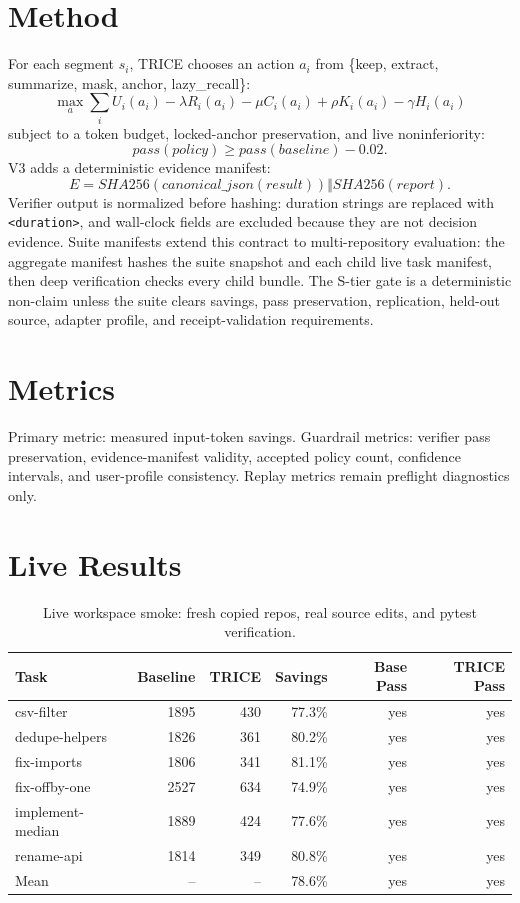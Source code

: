 \documentclass[10pt]{article}
\begin{document}
        \section{Method}
        For each segment $s_i$, TRICE chooses an action $a_i$ from
        \{keep, extract, summarize, mask, anchor, lazy\_recall\}:
        \[
        \max_a \sum_i U_i(a_i) - \lambda R_i(a_i) - \mu C_i(a_i)
        + \rho K_i(a_i) - \gamma H_i(a_i)
        \]
        subject to a token budget, locked-anchor preservation, and live
        noninferiority:
        \[
        pass(policy) \ge pass(baseline) - 0.02.
        \]
        V3 adds a deterministic evidence manifest:
        \[
        E = SHA256(canonical\_json(result)) \Vert SHA256(report).
        \]
        Verifier output is normalized before hashing: duration strings are
        replaced with \texttt{<duration>}, and wall-clock fields are excluded
        because they are not decision evidence.
        Suite manifests extend this contract to multi-repository evaluation:
        the aggregate manifest hashes the suite snapshot and each child live
        task manifest, then deep verification checks every child bundle.
        The S-tier gate is a deterministic non-claim unless the suite clears
        savings, pass preservation, replication, held-out source, adapter
        profile, and receipt-validation requirements.

        \section{Metrics}
        Primary metric: measured input-token savings. Guardrail metrics:
        verifier pass preservation, evidence-manifest validity, accepted policy
        count, confidence intervals, and user-profile consistency. Replay
        metrics remain preflight diagnostics only.

        \section{Live Results}
        \begin{table}[h]
        \centering
        \begin{tabular}{lrrrrr}
        \toprule
        Task & Baseline & TRICE & Savings & Base Pass & TRICE Pass \\
        \midrule
        csv-filter & 1895 & 430 & 77.3\% & yes & yes \\
dedupe-helpers & 1826 & 361 & 80.2\% & yes & yes \\
fix-imports & 1806 & 341 & 81.1\% & yes & yes \\
fix-offby-one & 2527 & 634 & 74.9\% & yes & yes \\
implement-median & 1889 & 424 & 77.6\% & yes & yes \\
rename-api & 1814 & 349 & 80.8\% & yes & yes \\
        \midrule
        Mean & -- & -- & 78.6\% & yes & yes \\
        \bottomrule
        \end{tabular}
        \caption{Live workspace smoke: fresh copied repos, real source edits, and pytest verification.}
        \end{table}
\end{document}
